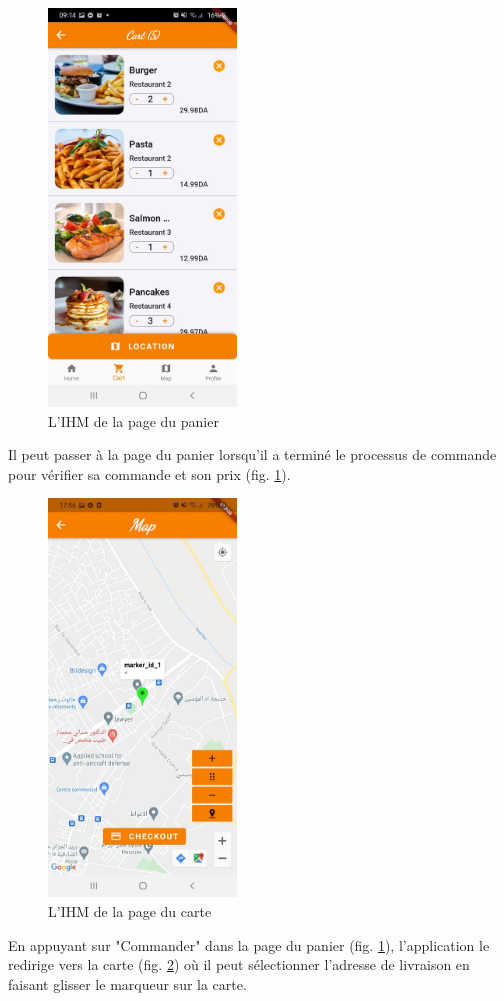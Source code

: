 \documentclass[french, a4paper, 12pt]{report}
\begin{document}
		\newpage
		\begin{figure}[h!]
			\center
			\includegraphics[width=5cm]{screenshots/ClientViews/theCART.jpg}
			\caption{L'IHM de la page du panier}
			\label{fig:clicrt}
		\end{figure} Il peut passer à la page du panier lorsqu'il a terminé le processus de commande pour vérifier sa commande et son prix (fig. \ref{fig:clicrt}).

\newpage

		\begin{figure}[h!]
			\center
			\includegraphics[width=5cm]{screenshots/ClientViews/Deliverymap(fonctional).jpg}
			\caption{L'IHM de la page du carte}
			\label{fig:climap}
		\end{figure} En appuyant sur "Commander" dans la page du panier (fig. \ref{fig:clicrt}), l'application le redirige vers la carte (fig. \ref{fig:climap}) où il peut sélectionner l'adresse de livraison en faisant glisser le marqueur sur la carte.
\end{document}
